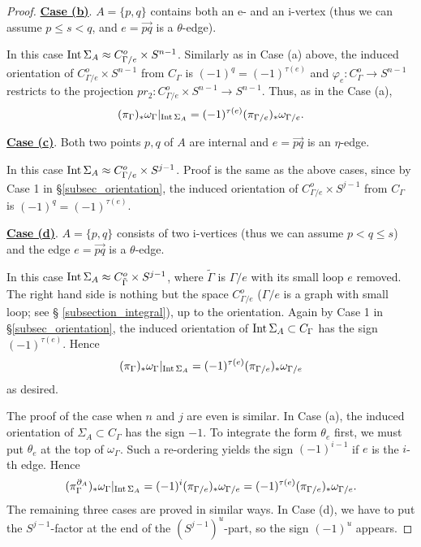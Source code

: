 \begin{proof}
\noindent
\underline{\bf Case (b)}.
$A= \{ p,q\}$ contains both an e- and an i-vertex (thus we can assume $p \le s <q$, and
$e=\overrightarrow{pq}$ is a $\theta$-edge).


In this case $\mathrm{Int}\, \Sigma_A \approx C^o_{\Gamma / e} \times S^{n-1}$.
Similarly as in Case (a) above, the induced orientation of $C^o_{\Gamma / e} \times S^{n-1}$ from $C_{\Gamma}$
is $(-1)^q =(-1)^{\tau (e)}$ and $\varphi_e : C^o_{\Gamma} \to S^{n-1}$ restricts to the projection
$pr_2 : C^o_{\Gamma /e} \times S^{n-1} \to S^{n-1}$.
Thus, as in the Case (a),
\[
 (\pi_{\Gamma})_* \omega_{\Gamma}|_{\mathrm{Int}\, \Sigma_A}  = (-1)^{\tau (e)} (\pi_{\Gamma /e})_* \omega_{\Gamma /e}.
\]


\noindent
\underline{\bf Case (c)}.
Both two points $p,q$ of $A$ are internal and $e=\overrightarrow{pq}$ is an $\eta$-edge.


In this case $\mathrm{Int}\, \Sigma_A \approx C^o_{\Gamma /e} \times S^{j-1}$.
Proof is the same as the above cases, since by Case 1 in \S \ref{subsec_orientation}, the induced orientation of
$C^o_{\Gamma / e} \times S^{j-1}$ from $C_{\Gamma}$ is $(-1)^q =(-1)^{\tau (e)}$.



\noindent
\underline{\bf Case (d)}.
$A=\{ p,q\}$ consists of two i-vertices (thus we can assume $p<q\le s$) and the edge $e=\overrightarrow{pq}$ is a
$\theta$-edge.


In this case $\mathrm{Int}\, \Sigma_A \approx C^o_{\tilde{\Gamma}} \times S^{j-1}$, where $\tilde{\Gamma}$ is $\Gamma /e$
with its small loop $e$ removed.
The right hand side is nothing but the space $C^o_{\Gamma /e}$ ($\Gamma /e$ is a graph with small loop; see \S
\ref{subsection_integral}), up to the orientation.
Again by Case 1 in \S \ref{subsec_orientation}, the induced orientation of $\mathrm{Int}\, \Sigma_A \subset C_{\Gamma}$ has the
sign $(-1)^{\tau (e)}$.
Hence
\[
 (\pi_{\Gamma})_* \omega_{\Gamma}|_{\mathrm{Int}\, \Sigma_A}  = (-1)^{\tau (e)} (\pi_{\Gamma /e})_* \omega_{\Gamma /e}
\]
as desired.


The proof of the case when $n$ and $j$ are even is similar.
In Case (a), the induced orientation of $\Sigma_A \subset C_{\Gamma}$ has the sign $-1$.
To integrate the form $\theta_e$ first, we must put $\theta_e$ at the top of $\omega_{\Gamma}$.
Such a re-ordering yields the sign $(-1)^{i-1}$ if $e$ is the $i$-th edge.
Hence
\[
 (\pi^{\partial_A}_{\Gamma})_* \omega_{\Gamma}|_{\mathrm{Int}\, \Sigma_A} = (-1)^i (\pi_{\Gamma / e})_* \omega_{\Gamma / e}
 = (-1)^{\tau (e)}(\pi_{\Gamma / e})_* \omega_{\Gamma / e}.
\]
The remaining three cases are proved in similar ways.
In Case (d), we have to put the $S^{j-1}$-factor at the end of the $(S^{j-1})^u$-part, so the sign $(-1)^u$ appears.



\end{proof}
